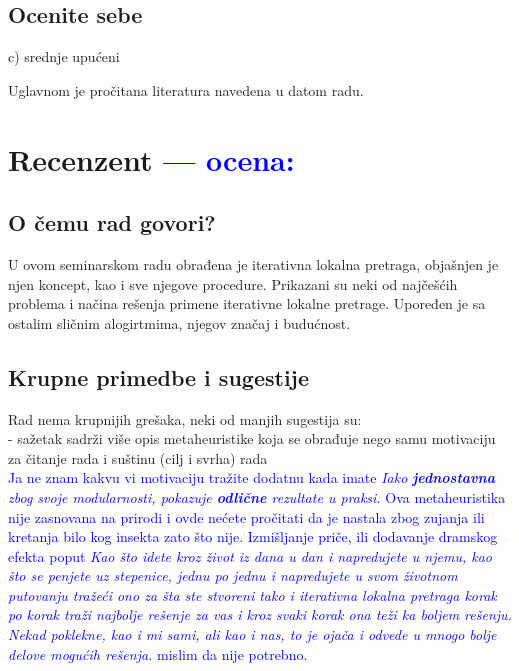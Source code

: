 \documentclass[a4paper]{report}
\newcommand{\odgovor}[1]{\textcolor{blue}{#1}}
\begin{document}
\section{Ocenite sebe}
c) srednje upućeni

Uglavnom je pročitana literatura navedena u datom radu.

\chapter{Recenzent \odgovor{--- ocena:} }


\section{O čemu rad govori?}

U ovom seminarskom radu obrađena je iterativna lokalna pretraga, objašnjen je njen koncept, kao i  sve njegove procedure. Prikazani su neki od najčešćih problema i načina rešenja primene iterativne lokalne pretrage. Upoređen je sa ostalim sličnim alogirtmima, njegov značaj i budućnost.

\section{Krupne primedbe i sugestije}

Rad nema krupnijih grešaka, neki od manjih sugestija su:\\
- sažetak sadrži više opis metaheuristike koja se obrađuje nego samu motivaciju za čitanje rada i suštinu (cilj i svrha) rada\\
\odgovor{Ja ne znam kakvu vi motivaciju tražite dodatnu kada imate \textit{Iako \textbf{jednostavna} zbog svoje modularnosti, pokazuje \textbf{odlične} rezultate u praksi.} Ova metaheuristika nije zasnovana na prirodi i ovde nećete pročitati 
da je nastala zbog zujanja ili kretanja bilo kog insekta zato što nije. Izmišljanje priče, ili dodavanje dramskog efekta poput \textit{Kao što idete kroz život iz dana u dan i napredujete u njemu, kao što se penjete uz stepenice, jednu po jednu i napredujete u svom životnom putovanju tražeći ono za šta ste stvoreni tako i iterativna lokalna pretraga korak po korak traži najbolje rešenje za vas i kroz 
svaki korak ona teži ka boljem rešenju. Nekad poklekne, kao i mi sami, ali kao i nas, to je ojača i odvede u mnogo bolje delove mogućih rešenja.} mislim da nije potrebno.\\}
\end{document}

